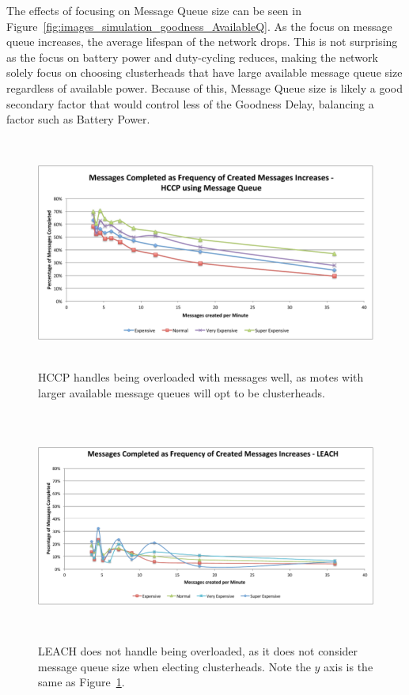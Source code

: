 The effects of focusing on Message Queue size can be seen in Figure~\ref{fig:images_simulation_goodness_AvailableQ}. 
As the focus on message queue increases, the average lifespan of the network drops. This is not surprising as the focus
on battery power and duty-cycling reduces, making the network solely focus on choosing clusterheads that have
large available message queue size regardless of available power. Because of this, Message Queue size is likely a good 
secondary factor that would control less of the Goodness Delay, balancing a factor such as Battery Power.

\begin{figure}[htbp]
    \centering
        \includegraphics[height=3in]{images/messageFrequency/HCCP.pdf}
    \caption{HCCP handles being overloaded with messages well, as motes with larger available message queues will opt to be clusterheads.}
    \label{fig:images_messageFrequency_HCCP}
\end{figure}

\begin{figure}[htbp]
    \centering
        \includegraphics[height=3in]{images/messageFrequency/LEACH.pdf}
    \caption{LEACH does not handle being overloaded, as it does not consider message queue size when electing clusterheads. Note the $y$ axis is the same as Figure~\ref{fig:images_messageFrequency_HCCP}.}
    \label{fig:images_messageFrequency_LEACH}
\end{figure}

